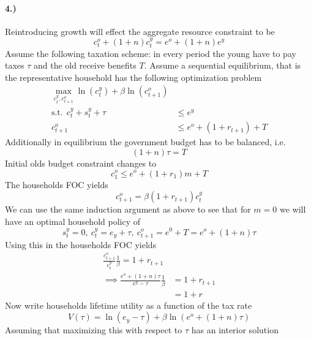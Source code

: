 \paragraph{4.)}

Reintroducing growth will effect the aggregate resource constraint to be
\begin{equation*}
  c_t^o + (1 + n) c_t^y = e^o + (1 + n) e^y
\end{equation*}
Assume the following taxation scheme: in every period the young have to pay
taxes $\tau$ and the old receive benefits $T$. Assume a sequential equilibrium,
that is the representative household has the following optimization problem
\begin{align*}
  \max_{c_t^y, c_{t+1}^o} \ln(c_t^y) + \beta \ln(c_{t+1}^o) \\
  \text{s.t.}~~c_t^y + s_t^y + \tau &\leq e^y \\
  c_{t+1}^o &\leq e^o + (1 + r_{t+1}) + T
\end{align*}
Additionally in equilibrium the government budget has to be balanced, i.e.
\begin{equation*}
  (1 + n) \tau = T
\end{equation*}
Initial olds budget constraint changes to
\begin{equation*}
  c_1^o \leq e^o + (1 + r_1) m + T
\end{equation*}
The households FOC yields
\begin{equation*}
  c_{t+1}^o = \beta (1 + r_{t+1}) c_t^y
\end{equation*}
We can use the same induction argument as above to see that for $m = 0$ we will
have an optimal household policy of
\begin{equation*}
  s_t^y = 0,~c_t^y = e_y + \tau,~c_{t+1}^o = e^0 + T = e^o + (1 + n) \tau
\end{equation*}
Using this in the households FOC yields
\begin{align*}
  \frac{c_{t+1}^o}{c_t^y} \frac{1}{\beta} = 1 + r_{t+1} \\
  \implies \frac{e^o + (1 + n) \tau}{e^y - \tau} \frac{1}{\beta} &= 1 + r_{t+1}
  \\ 
  &= 1 + r
\end{align*}
Now write households lifetime utility as a function of the tax rate
\begin{equation*}
  V(\tau) = \ln(e_y - \tau) + \beta \ln(e^o + (1 + n) \tau)
\end{equation*}
Assuming that maximizing this with respect to $\tau$ has an interior solution
